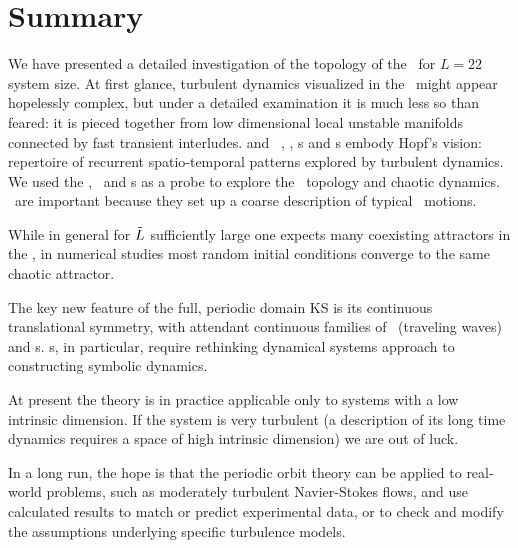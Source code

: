 
\section{Summary}
\label{sect:rpo-sum}


We have presented a detailed investigation
of the topology of the
{\KS} \statesp\ for $L=22$ system size.
At first glance, turbulent dynamics visualized in the \statesp\ might appear
hopelessly complex, but under a detailed examination it is
much less so than feared: it is
pieced together from low dimensional %
local unstable manifolds connected by fast transient interludes.
{\KS} and \pCf\  \eqv, \reqv, \po s and 
\rpo s embody Hopf's vision:
repertoire of recurrent spatio-temporal
patterns explored by turbulent dynamics.
We used
the \eqva, \reqva\ and {\rpo}s as a probe to explore the
\statesp\  topology and chaotic dynamics.
\Eqva\ are important because they set up 
a coarse description of 
typical \statesp\ motions.

While in general
for $\tilde{L}$ sufficiently large
one expects many 
coexisting attractors in the \statesp%
,
in numerical studies most random initial
conditions converge to the same chaotic attractor. 

The key new feature of the full, periodic domain
KS is its continuous translational symmetry,
with attendant continuous families of
\reqva\ (traveling waves) and \rpo s.
\Rpo s, in particular, require rethinking dynamical systems
approach to constructing symbolic dynamics. 


At present the theory is in practice applicable only to systems
with a low intrinsic dimension.
If the system is very turbulent
(a description of its long time dynamics requires a space of high
intrinsic dimension) we are out of luck. 

In a long run, the hope is that the periodic orbit theory
can be applied to real-world
problems, such as moderately turbulent Navier-Stokes
flows, and use calculated results to match or predict
experimental data, or to check and modify the assumptions underlying specific
turbulence models.




